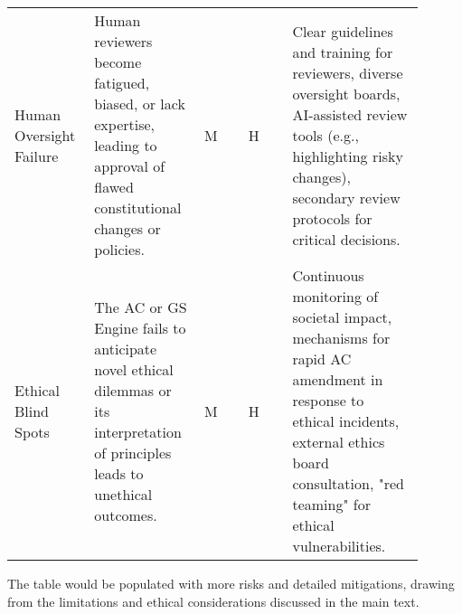 \documentclass[sigconf,review,screen]{acmart}
\begin{document}
\begin{table*}[htbp]
\begin{tabular}{@{}p{0.15\linewidth}p{0.25\linewidth}p{0.1\linewidth}p{0.1\linewidth}p{0.3\linewidth}@{}}
    \addlinespace
    Human Oversight Failure & Human reviewers become fatigued, biased, or lack expertise, leading to approval of flawed constitutional changes or policies. & M & H & Clear guidelines and training for reviewers, diverse oversight boards, AI-assisted review tools (e.g., highlighting risky changes), secondary review protocols for critical decisions. \\
    \addlinespace
    Ethical Blind Spots & The AC or GS Engine fails to anticipate novel ethical dilemmas or its interpretation of principles leads to unethical outcomes. & M & H & Continuous monitoring of societal impact, mechanisms for rapid AC amendment in response to ethical incidents, external ethics board consultation, "red teaming" for ethical vulnerabilities. \\
    \bottomrule
  \end{tabular}
\end{table*}
The table would be populated with more risks and detailed mitigations, drawing from the limitations and ethical considerations discussed in the main text.

\balance %
\end{document}
